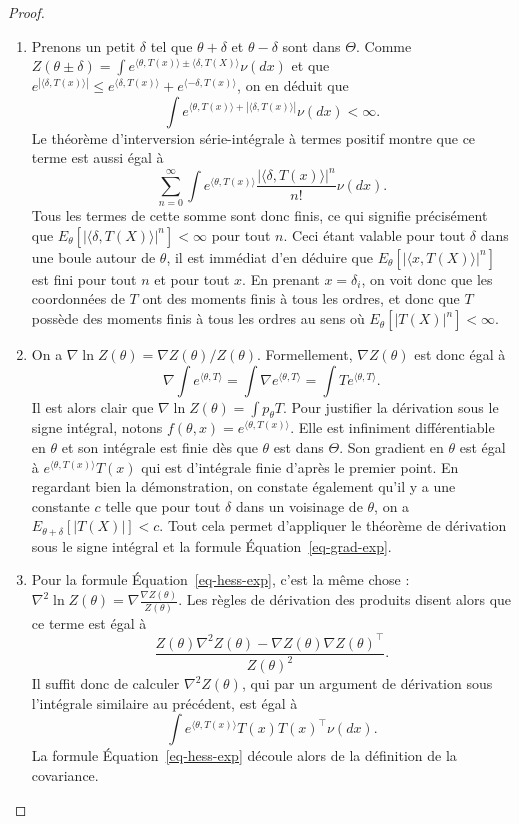 \documentclass[
  10,
  letterpaper,
  DIV=11,
  numbers=noendperiod]{scrreport}
\theoremstyle{plain}
\theoremstyle{definition}
\theoremstyle{plain}
\theoremstyle{definition}
\theoremstyle{definition}
\theoremstyle{plain}
\theoremstyle{remark}
\begin{document}
\begin{proof}

\begin{enumerate}
\def\labelenumi{\arabic{enumi}.}
\item
  Prenons un petit \(\delta\) tel que \(\theta + \delta\) et
  \(\theta - \delta\) sont dans \(\Theta\). Comme
  \(Z(\theta \pm \delta) = \int e^{\langle \theta, T(x)\rangle \pm \langle \delta, T(X)\rangle}\nu(dx)\)
  et que
  \(e^{|\langle \delta, T(x)\rangle|}\leqslant e^{\langle \delta, T(x)\rangle} + e^{\langle -\delta, T(x)\rangle}\),
  on en déduit que
  \[\int e^{\langle \theta, T(x)\rangle + |\langle \delta, T(x)\rangle|}\nu(dx)<\infty. \]
  Le théorème d'interversion série-intégrale à termes positif montre que
  ce terme est aussi égal à
  \[ \sum_{n=0}^\infty \int e^{\langle \theta, T(x)\rangle}\frac{|\langle \delta, T(x)\rangle|^n}{n!}\nu(dx).\]
  Tous les termes de cette somme sont donc finis, ce qui signifie
  précisément que \(E_\theta[|\langle \delta, T(X)\rangle|^n]<\infty\)
  pour tout \(n\). Ceci étant valable pour tout \(\delta\) dans une
  boule autour de \(\theta\), il est immédiat d'en déduire que
  \(E_\theta[|\langle x, T(X)\rangle|^n]\) est fini pour tout \(n\) et
  pour tout \(x\). En prenant \(x = \delta_i\), on voit donc que les
  coordonnées de \(T\) ont des moments finis à tous les ordres, et donc
  que \(T\) possède des moments finis à tous les ordres au sens où
  \(E_\theta[|T(X)|^n]<\infty\).
\item
  On a \(\nabla \ln Z(\theta) = \nabla Z(\theta)/Z(\theta)\).
  Formellement, \(\nabla Z(\theta)\) est donc égal à
  \[\nabla \int e^{\langle \theta, T\rangle} = \int \nabla e^{\langle \theta, T\rangle} = \int T e^{\langle \theta, T\rangle}. \]
  Il est alors clair que \(\nabla \ln Z(\theta) = \int p_\theta T\).
  Pour justifier la dérivation sous le signe intégral, notons
  \(f(\theta, x) = e^{\langle \theta, T(x)\rangle}\). Elle est
  infiniment différentiable en \(\theta\) et son intégrale est finie dès
  que \(\theta\) est dans \(\Theta\). Son gradient en \(\theta\) est
  égal à \(e^{\langle \theta, T(x)\rangle}T(x)\) qui est d'intégrale
  finie d'après le premier point. En regardant bien la démonstration, on
  constate également qu'il y a une constante \(c\) telle que pour tout
  \(\delta\) dans un voisinage de \(\theta\), on a
  \(E_{\theta + \delta}[|T(X)|]<c\). Tout cela permet d'appliquer le
  théorème de dérivation sous le signe intégral et la formule
  Équation~\ref{eq-grad-exp}.
\item
  Pour la formule Équation~\ref{eq-hess-exp}, c'est la même chose
  :~\(\nabla^2 \ln Z(\theta) = \nabla \frac{\nabla Z(\theta)}{Z(\theta)}\).
  Les règles de dérivation des produits disent alors que ce terme est
  égal à
  \[\frac{Z(\theta)\nabla^2 Z(\theta) - \nabla Z(\theta)\nabla Z(\theta)^\top}{Z(\theta)^2}. \]
  Il suffit donc de calculer \(\nabla^2 Z(\theta)\), qui par un argument
  de dérivation sous l'intégrale similaire au précédent, est égal à
  \[ \int e^{\langle \theta, T(x)\rangle}T(x)T(x)^\top \nu(dx).\] La
  formule Équation~\ref{eq-hess-exp} découle alors de la définition de
  la covariance.
\end{enumerate}

\end{proof}
\end{document}
